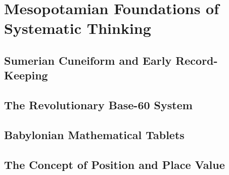 
\chapter{Mesopotamian Foundations of Systematic Thinking}

\section{Sumerian Cuneiform and Early Record-Keeping}

\section{The Revolutionary Base-60 System}

\section{Babylonian Mathematical Tablets}

\section{The Concept of Position and Place Value}
